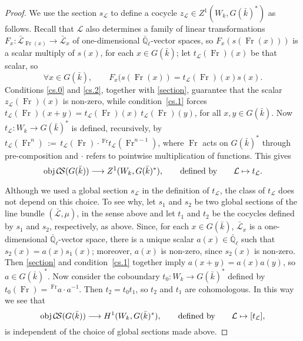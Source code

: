 \documentclass[11pt]{amsart}
\theoremstyle{plain}
\theoremstyle{definition}
\theoremstyle{remark}
\newcommand{\EE}{\mathbb{\bar Q}_\ell}
\newcommand{\bFq}{\bar{k}}
\newcommand{\Fq}{k}
\newcommand{\Frob}{{\operatorname{Fr}}}
\newcommand{\ceq}{{\, :=\, }}
\newcommand{\obj}{{\text{obj}\, }}
\newcommand{\cs}[1]{{\mathcal{#1}}}
\newcommand{\gcs}[1]{{\mathcal{\bar #1}}}
\newcommand{\CS}{{\mathcal{C\hskip-1.8pt S}}}
\newcommand\Clifton[1]{\marginpar{\smaller\smaller CC: #1}}
\begin{document}
\begin{proof}
We use the section $s_\cs{L}$ to define a cocycle $z_\cs{L} \in Z^1(W_\Fq,G(\bFq)^*)$ as follows. Recall that $\cs{L}$ also determines a family of linear transformations $F_x : \gcs{L}_{\Frob(x)} \to \gcs{L}_x$ of one-dimensional $\EE$-vector spaces,  so $F_x(s(\Frob(x)))$ is a scalar multiply of $s(x)$, for each $x\in G(\bFq)$; let $t_\cs{L}(\Frob)(x)$ be that scalar, so
\begin{equation}\label{t}
\forall x\in G(\bFq),\qquad F_{x}(s(\Frob(x)) = t_\cs{L}(\Frob)(x) s(x).
\end{equation}
Conditions \ref{cs.0} and \ref{cs.2}, together with \eqref{section}, guarantee that the scalar $z_\cs{L}(\Frob)(x)$ is non-zero, while condition~\ref{cs.1} forces $t_\cs{L}(\Frob)(x+y) = t_\cs{L}(\Frob)(x) \ t_\cs{L}(\Frob)(y)$, for all $x,y \in G(\bFq)$. 
Now $t_\cs{L} : W_\Fq \to G(\bFq)^*$ is defined, recursively, by $t_\cs{L}(\Frob^n) \ceq t_\cs{L}(\Frob)\cdot \,^\Frob t_\cs{L}(\Frob^{n-1})$, where $\Frob$ acts on $G(\bFq)^*$ through pre-composition and $\cdot$ refers to pointwise multiplication of functions. This gives
\[
\obj \CS(G(\bFq)) \longrightarrow Z^1(W_\Fq,G(\bFq)^*), \qquad \text{defined by} \qquad \cs{L} \mapsto t_\cs{L}.
\]

Although we used a global section $s_\cs{L}$ in the definition of $t_\cs{L}$, the class of $t_\cs{L}$ does not depend on this choice. To see why, let $s_1$ and $s_2$ be two global sections of the line bundle $(\gcs{L},\mu)$, in the sense above and let $t_1$ and $t_2$ be the cocycles defined by $s_1$ and $s_2$, respectively, as above. Since, for each $x\in G(\bFq)$, $\gcs{L}_x$ is a one-dimensional $\EE$-vector space, there is a unique scalar $a(x) \in \EE$ such that $s_2(x) = a(x) s_1(x)$; moreover, $a(x)$ is non-zero, since $s_2(x)$ is non-zero. Then \eqref{section} and condition~\ref{cs.1} together imply $a(x+y) = a(x)a(y)$, so $a\in G(\bFq)^*$. Now consider the  coboundary $t_0 : W_\Fq \to G(\bFq)^*$ defined by $t_0(\Frob) = \,^\Frob a \cdot a^{-1}$. Then $t_2 = t_0 t_1$, so $t_2$ and $t_1$ are cohomologous. In this way we see that
\begin{equation}\label{cohomologous}
\obj \CS(G(\bFq)) \longrightarrow H^1(W_\Fq,G(\bFq)^*), \qquad \text{defined by} \qquad \cs{L} \mapsto [t_\cs{L}],
\end{equation}
is independent of the choice of global sections made above.


\end{proof}
\end{document}
